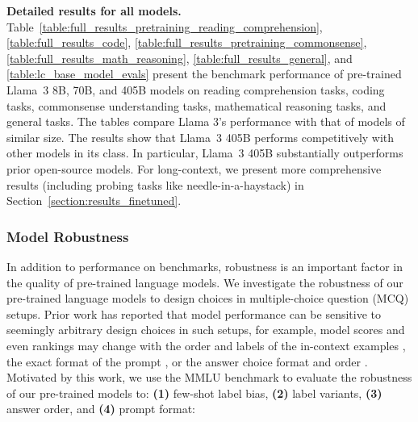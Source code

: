\textbf{Detailed results for all models.} 
Table~\ref{table:full_results_pretraining_reading_comprehension}, \ref{table:full_results_code}, \ref{table:full_results_pretraining_commonsense}, \ref{table:full_results_math_reasoning}, \ref{table:full_results_general}, and \ref{table:lc_base_model_evals} present the benchmark performance of pre-trained Llama~3 8B, 70B, and 405B models on reading comprehension tasks, coding tasks, commonsense understanding tasks, mathematical reasoning tasks, and general tasks. The tables compare Llama 3's performance with that of models of similar size. The results show that Llama~3 405B performs competitively with other models in its class. In particular, Llama~3 405B substantially outperforms prior open-source models. For long-context, we present more comprehensive results (including probing tasks like needle-in-a-haystack) in Section~\ref{section:results_finetuned}.

\subsubsection{Model Robustness}\label{subsec:robustness}

In addition to performance on benchmarks, robustness is an important factor in the quality of pre-trained language models. We investigate the robustness of our pre-trained language models to design choices in multiple-choice question (MCQ) setups. Prior work has reported that model performance can be sensitive to seemingly arbitrary design choices in such setups, for example, model scores and even rankings may change with the order and labels of the in-context examples \citep[]{lu-etal-2022-fantastically,zhao2021calibrate,robison2023leveraging,liang2022holistic,gupta2024changinganswerorderdecrease}, the exact format of the prompt \citep{weber2023icl,mishra-etal-2022-reframing}, or the answer choice format and order \citep{alzahrani2024when,wang2024beyond,zheng2023large}. Motivated by this work, we use the MMLU benchmark to evaluate the robustness of our pre-trained models to: \textbf{(1)} few-shot label bias, \textbf{(2)} label variants, \textbf{(3)} answer order, and \textbf{(4)} prompt format:

